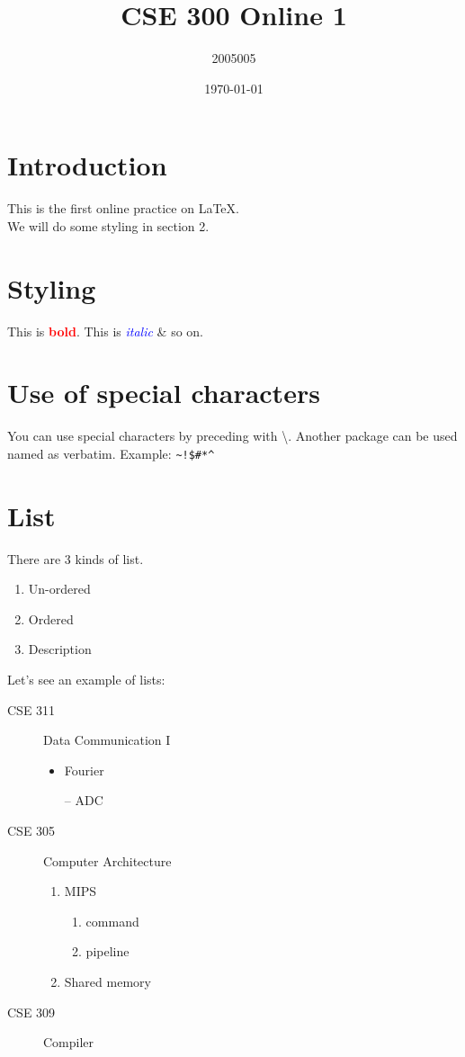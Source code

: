 \documentclass[14pt]{article}
\title{CSE 300 Online 1}
\author{2005005}
\date{\today}
\begin{document}
    \maketitle
    \tableofcontents
    \section{Introduction}
     This is the first online practice on \LaTeX.\\We will do some styling in section 2.
    \section{Styling} 
    This is \textcolor{red}{\textbf{bold}}. This is \textcolor{blue}{\textit{italic}} \& so on.
    \section*{Use of special characters}
    You can use special characters by preceding with \textbackslash. Another package can be
    used named as verbatim. Example: \texttt{\~{}!\$\#\textbackslash@*\^}
    \section{List}
    There are 3 kinds of list.
    \begin{enumerate}[label =\roman*.]
        \item Un-ordered
        \item Ordered
        \item Description
    \end{enumerate}
    \pagebreak
    Let’s see an example of lists:
    \begin{description}
        \item [CSE 311] Data Communication I
        \begin{itemize}
            \item Fourier
            \item [--] ADC
        \end{itemize}
        \item [CSE 305] Computer Architecture
        \begin{enumerate}
            \item MIPS
            \begin{enumerate}
                \item command
                \item pipeline
            \end{enumerate}
            \item Shared memory
        \end{enumerate}
        \item [CSE 309] Compiler 
    \end{description}
\end{document}
